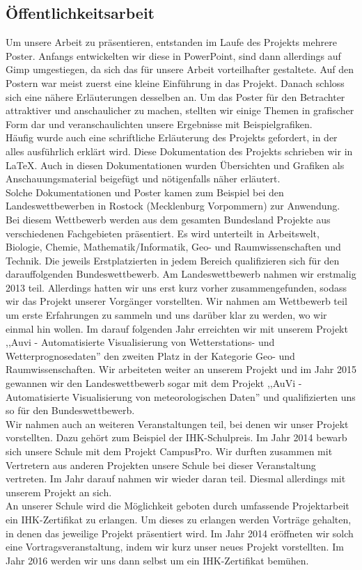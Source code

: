 \subsection{Öffentlichkeitsarbeit} %
Um unsere Arbeit zu präsentieren, entstanden im Laufe des Projekts mehrere Poster.
Anfangs entwickelten wir diese in PowerPoint, sind dann allerdings auf Gimp umgestiegen,
da sich das für unsere Arbeit vorteilhafter gestaltete.
Auf den Postern war meist zuerst eine kleine Einführung in das Projekt.
Danach schloss sich eine nähere Erläuterungen desselben an.
Um das Poster für den Betrachter attraktiver und anschaulicher zu machen,
stellten wir einige Themen in grafischer Form dar und veranschaulichten unsere Ergebnisse mit Beispielgrafiken. \\
Häufig wurde auch eine schriftliche Erläuterung des Projekts gefordert,
in der alles ausführlich erklärt wird.
Diese Dokumentation des Projekts schrieben wir in \LaTeX .
Auch in diesen Dokumentationen wurden Übersichten und Grafiken als Anschauungsmaterial beigefügt und nötigenfalls näher erläutert.\\
Solche Dokumentationen und Poster kamen zum Beispiel bei den Landeswettbewerben \jf in Rostock (Mecklenburg Vorpommern) zur Anwendung.
Bei diesem Wettbewerb werden aus dem gesamten Bundesland Projekte aus verschiedenen Fachgebieten präsentiert.
Es wird unterteilt in Arbeitswelt, Biologie, Chemie, Mathematik/Informatik, Geo- und Raumwissenschaften und Technik.
Die jeweils Erstplatzierten in jedem Bereich qualifizieren sich für den darauffolgenden Bundeswettbewerb.
Am Landeswettbewerb nahmen wir erstmalig 2013 teil.
Allerdings hatten wir uns erst kurz vorher zusammengefunden,
sodass wir das Projekt unserer Vorgänger vorstellten.
Wir nahmen am Wettbewerb teil um erste Erfahrungen zu sammeln und uns darüber klar zu werden,
wo wir einmal hin wollen.
Im darauf folgenden Jahr erreichten wir mit unserem Projekt ,,Auvi - Automatisierte Visualisierung von Wetterstations- und Wetterprognosedaten'' den zweiten Platz in der Kategorie Geo- und Raumwissenschaften.
Wir arbeiteten weiter an unserem Projekt und im Jahr 2015 gewannen wir den Landeswettbewerb sogar mit dem Projekt ,,AuVi - Automatisierte Visualisierung von meteorologischen Daten'' und qualifizierten uns so für den Bundeswettbewerb.\\
Wir nahmen auch an weiteren Veranstaltungen teil,
bei denen wir unser Projekt vorstellten.
Dazu gehört zum Beispiel der IHK-Schulpreis.
Im Jahr 2014 bewarb sich unsere Schule mit dem Projekt CampusPro.
Wir durften zusammen mit Vertretern aus anderen Projekten unsere Schule bei dieser Veranstaltung vertreten.
Im Jahr darauf nahmen wir wieder daran teil. Diesmal allerdings mit unserem Projekt an sich.\\
An unserer Schule wird die Möglichkeit geboten durch umfassende Projektarbeit ein IHK-Zertifikat zu erlangen.
Um dieses zu erlangen werden Vorträge gehalten, in denen das jeweilige Projekt präsentiert wird.
Im Jahr 2014 eröffneten wir solch eine Vortragsveranstaltung,
indem wir kurz unser neues Projekt vorstellten.
Im Jahr 2016 werden wir uns dann selbst um ein IHK-Zertifikat bemühen.
